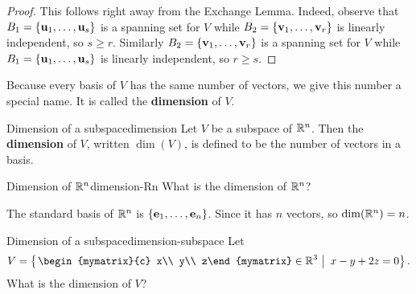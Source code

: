 \begin{proof}
  This follows right away from the Exchange Lemma. Indeed, observe
  that $B_1 = \left\{ \mbox{\bf u}_{1},\ldots ,\mbox{\bf u}_{s}\right\} $ is a spanning
  set for $V$ while $ B_2 = \left\{\mbox{\bf v}_{1},\ldots ,\mbox{\bf v}_{r}\right\} $
  is linearly independent, so $s \geq r$. Similarly
  $B_2 = \left\{\mbox{\bf v}_{1},\ldots ,\mbox{\bf v} _{r}\right\} $ is a spanning set
  for $V$ while $B_1 = \left\{\mbox{\bf u}_{1},\ldots , \mbox{\bf u}_{s}\right\} $ is
  linearly independent, so $r\geq s$.
\end{proof}

Because every basis of $V$ has the same number of vectors, we give
this number a special name. It is called the \textbf{dimension} of
$V$.

\begin{definition}{Dimension of a subspace}{dimension}
  Let $V$ be a subspace of\/ $\mathbb{R}^{n}$. Then the \textbf{dimension}%
   of $V$, written $\dim(V)$, is
  defined to be the number of vectors in a basis.
\end{definition}

\begin{example}{Dimension of\/ $\mathbb{R}^n$}{dimension-Rn}
  What is the dimension of $\mathbb{R}^{n}$?
\end{example}

\begin{solution}
  The standard basis of $\mathbb{R}^{n}$ is
  $\left\{\mbox{\bf e}_{1},\ldots,\mbox{\bf e}_{n}\right\}$. Since it has $n$ vectors,
  so $\dim(\mathbb{R}^n) = n$.
\end{solution}

\begin{example}{Dimension of a subspace}{dimension-subspace}
  Let
  \begin{equation*}
    V=\set{\left.
      \begin{mymatrix}{c} x\\ y\\ z\end{mymatrix}\in\R^3 ~\right\vert~
      x-y+2z = 0
    }.
  \end{equation*}
  What is the dimension of\/ $V$?
\end{example}

